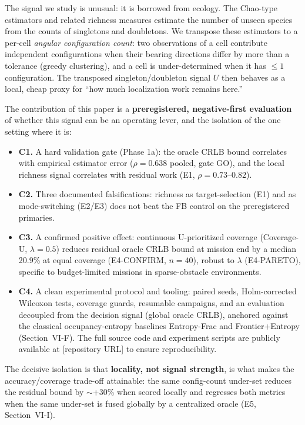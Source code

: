 \documentclass[journal]{IEEEtran}
\newcommand{\CU}{Coverage-U}
\begin{document}
The signal we study is unusual: it is borrowed from ecology. The Chao-type
estimators \cite{Chao1984, ChaoLee1992, ChaoYang1993} and related richness
measures estimate the number of unseen species from the counts of singletons
and doubletons. We transpose these estimators to a per-cell \emph{angular
configuration count}: two observations of a cell contribute independent
configurations when their bearing directions differ by more than a tolerance
(greedy clustering), and a cell is under-determined when it has
$\leq 1$ configuration. The transposed singleton/doubleton signal $U$ then
behaves as a local, cheap proxy for ``how much localization work remains
here.''

The contribution of this paper is a \textbf{preregistered, negative-first
evaluation} of whether this signal can be an operating lever, and the
isolation of the one setting where it is:
\begin{itemize}
\item \textbf{C1.} A hard validation gate (Phase 1a): the oracle CRLB bound
correlates with empirical estimator error ($\rho = 0.638$ pooled, gate GO),
and the local richness signal correlates with residual work (E1,
$\rho = 0.73$--$0.82$).
\item \textbf{C2.} Three documented falsifications: richness as
target-selection (E1) and as mode-switching (E2/E3) does not beat the FB
control on the preregistered primaries.
\item \textbf{C3.} A confirmed positive effect: continuous U-prioritized
coverage (\CU, $\lambda = 0.5$) reduces residual oracle CRLB bound at mission
end by a median 20.9\% at equal coverage (E4-CONFIRM, $n=40$), robust to
$\lambda$ (E4-PARETO), specific to budget-limited missions in sparse-obstacle
environments.
\item \textbf{C4.} A clean experimental protocol and tooling: paired seeds,
Holm-corrected Wilcoxon tests, coverage guards, resumable campaigns, and an
evaluation decoupled from the decision signal (global oracle CRLB), anchored
against the classical occupancy-entropy baselines Entropy-Frac and
Frontier+Entropy (Section~VI-F). The full source code and experiment scripts
are publicly available at [repository URL] to ensure reproducibility.
\end{itemize}

The decisive isolation is that \textbf{locality, not signal strength}, is what
makes the accuracy/coverage trade-off attainable: the same config-count
under-set reduces the residual bound by $\sim$+30\% when scored locally and
regresses both metrics when the same under-set is fused globally by a
centralized oracle (E5, Section~VI-I).
\end{document}
